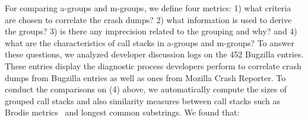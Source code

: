 \documentclass{llncs}
\begin{document}


For comparing a-groups and m-groups, we define four metrics: 1) what criteria are chosen to correlate the crash dumps? 2) what information is used to derive the groups? 3) is there any imprecision related to the grouping and why? and 4) what are the characteristics of call stacks in a-groups and m-groups? To answer these questions, we analyzed developer discussion logs on the 452 Bugzilla entries. These entries display the diagnostic process developers perform to correlate crash dumps from Bugzilla entries as well as ones from Mozilla Crash Reporter. To conduct the comparisons on (4) above, we automatically compute the sizes of grouped call stacks and also similarity measures between call stacks such as Brodie metrics~\cite{brodie:quickly} and longest common substrings. We found that:

\end{document}
